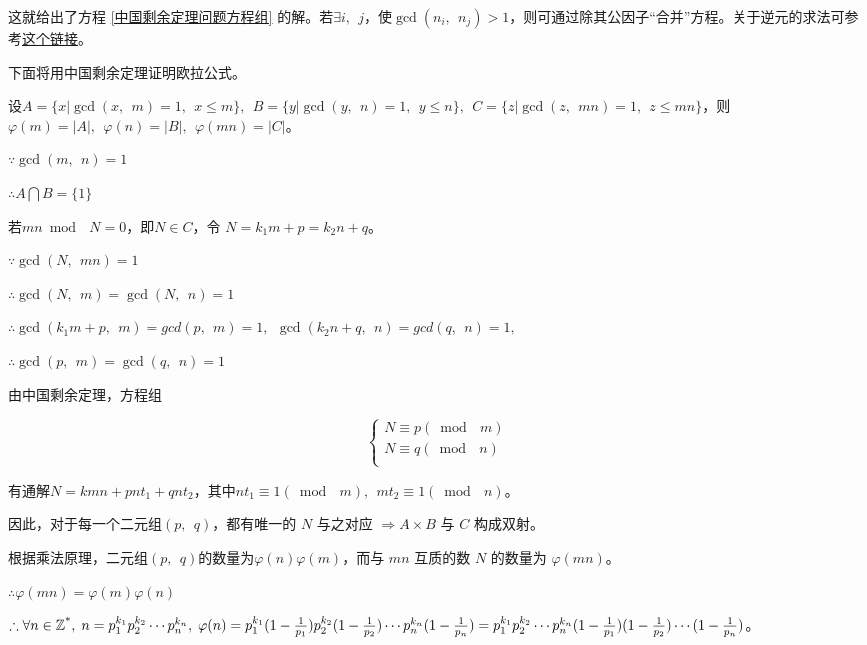 \documentclass[a4paper]{article}         %
\begin{document}
这就给出了方程 \ref{中国剩余定理问题方程组} 的解。若$\exists i, \phantom{;} j$，使$\gcd(n_i, \phantom{;} n_j) > 1$，则可通过除其公因子“合并”方程。关于逆元的求法可参考\href{https://blog.csdn.net/xiaoming_p/article/details/79644386}{这个链接}。

下面将用中国剩余定理证明欧拉公式。

设$A = \{ x \vert \gcd(x, \phantom{;} m) = 1, \phantom{;} x \leqslant m \}, \phantom{;} B = \{ y \vert \gcd(y, \phantom{;} n) = 1, \phantom{;} y \leqslant n \}, \phantom{;} C = \{ z \vert \gcd(z, \phantom{;} mn) = 1, \phantom{;} z \leqslant mn \}$，则 $\varphi(m) = \left\lvert A\right\rvert, \phantom{;}\varphi(n) = \left\lvert B\right\rvert, \phantom{;}\varphi(mn) = \left\lvert C\right\rvert$。

$\because \gcd(m, \phantom{;} n) = 1$

$\therefore A \bigcap B = \{ 1 \}$

若$mn \bmod \phantom{;} N = 0$，即$N \in C$，令 $N = k_1m + p = k_2n + q$。

$\because \gcd(N, \phantom{;} mn) = 1$

$\therefore \gcd(N, \phantom{;} m) = \gcd(N, \phantom{;} n) = 1$

$\therefore \gcd(k_1m + p, \phantom{;} m) = gcd(p, \phantom{;} m) = 1, \phantom{;} \gcd(k_2n + q, \phantom{;} n) = gcd(q, \phantom{;} n) = 1, \phantom{;}$

$\therefore \gcd(p, \phantom{;} m) = \gcd(q, \phantom{;} n) = 1$

由中国剩余定理，方程组

\[
    \begin{cases}
        N \equiv p(\bmod \phantom{;} m)\\
        N \equiv q(\bmod \phantom{;} n)\\
    \end{cases}
\]

有通解$N = kmn + pnt_1 + qnt_2$，其中$nt_1 \equiv 1(\bmod \phantom{;} m), \phantom{;} mt_2 \equiv 1 (\bmod \phantom{;} n)$。

因此，对于每一个二元组$(p, \phantom{;} q)$，都有唯一的 $N$ 与之对应 $\Rightarrow A \times B$ 与 $C$ 构成双射。

根据乘法原理，二元组$(p, \phantom{;} q)$的数量为$\varphi(n) \varphi(m)$，而与 $mn$ 互质的数 $N$ 的数量为 $\varphi(mn)$。

$\therefore \varphi(mn) = \varphi(m) \varphi(n)$

$\therefore \forall n \in \mathbb{Z\textsuperscript{*}}, \phantom{;} n = p_1^{k_1}p_2^{k_2} \cdots p_n^{k_n}, \phantom{;} \varphi(n) = p_1^{k_1}(1 - \frac{1}{p_1})p_2^{k_2}(1 - \frac{1}{p_2})\cdots p_n^{k_n}(1 - \frac{1}{p_n})=p_1^{k_1}p_2^{k_2}\cdots p_n^{k_n}(1 - \frac{1}{p_1})(1 - \frac{1}{p_2})\cdots (1 - \frac{1}{p_n})$。
\end{document}
